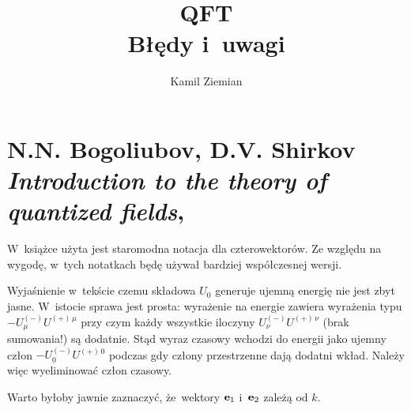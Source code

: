 \documentclass[a4paper,11pt]{article}
\title{QFT \\
  {\Large Błędy i~uwagi}}
\author{Kamil Ziemian}
\numberwithin{equation}{section}
\begin{document}





\maketitle





\section{N.N. Bogoliubov, D.V. Shirkov \\
  \textit{Introduction to the theory of quantized fields},
  \cite{BogoliubovShirkovIntroductionToTheoryOfQuantiezedFields1959}}


\vspace{0em}



\vspace{0em}


\noindent
W~książce użyta jest staromodna notacja dla czterowektorów. Ze względu
na wygodę, w~tych notatkach będę używał bardziej współczesnej wersji.







\noindent
{} Wyjaśnienie w~tekście czemu składowa $U_{ 0 }$ generuje
ujemną energię nie jest zbyt jasne. W~istocie sprawa jest prosta:
wyrażenie na energie zawiera wyrażenia typu
$-U^{ ( - ) }_{ \mu } U^{ ( + ) \, \mu }$ przy czym każdy wszystkie
iloczyny $U^{ ( - ) }_{ \nu } U^{ ( + )\, \nu }$ (brak sumowania!) są
dodatnie. Stąd wyraz czasowy wchodzi do energii jako ujemny człon
$-U^{ ( - ) }_{ 0 } U^{ ( + )\, 0 }$ podczas gdy człony przestrzenne
dają dodatni wkład. Należy więc wyeliminować człon czasowy.

\VerSpaceFour





\noindent
{} Warto byłoby jawnie zaznaczyć, że~wektory $\mathbf{e}_{ 1 }$
i~$\mathbf{e}_{ 2 }$ zależą od $k$.
\end{document}
